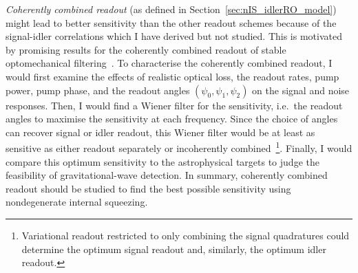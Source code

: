 \emph{Coherently combined readout} (as defined in Section~\ref{sec:nIS_idlerRO_model}) might lead to better sensitivity than the other readout schemes because of the signal-idler correlations which I have derived but not studied. This is motivated by promising results for the coherently combined readout of stable optomechanical filtering~\cite{liEnhancingInterferometerSensitivity2021}. To characterise the coherently combined readout, I would first examine the effects of realistic optical loss, the readout rates, pump power, pump phase, and the readout angles $(\psi_0,\psi_1,\psi_2)$ on the signal and noise responses. Then, I would find a Wiener filter for the sensitivity, i.e.\ the readout angles to maximise the sensitivity at each frequency. Since the choice of angles can recover signal or idler readout, this Wiener filter would be at least as sensitive as either readout separately or incoherently combined~\footnote{Variational readout restricted to only combining the signal quadratures could determine the optimum signal readout and, similarly, the optimum idler readout.}. Finally, I would compare this optimum sensitivity to the astrophysical targets to judge the feasibility of gravitational-wave detection.
In summary, coherently combined readout should be studied to find the best possible sensitivity using nondegenerate internal squeezing.


